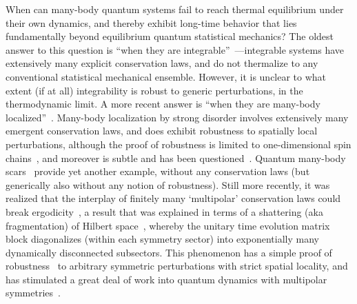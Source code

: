 When can many-body quantum systems fail to reach thermal equilibrium under their own dynamics, and thereby exhibit long-time behavior that lies fundamentally beyond equilibrium quantum statistical mechanics? The oldest answer to this question is ``when they are integrable''~\cite{Baxter2016Exactly}---integrable systems have extensively many explicit conservation laws, and do not thermalize to any conventional statistical mechanical ensemble. However, it is unclear to what extent (if at all) integrability is robust to generic perturbations, in the thermodynamic limit. A more recent answer is ``when they are many-body localized''~\cite{Nandkishore2015MBL, Abanin2019MBL}. Many-body localization by strong disorder involves extensively many emergent conservation laws, and does exhibit robustness to spatially local perturbations, although the proof of robustness is limited to one-dimensional spin chains~\cite{Imbrie2016MBL}, and moreover is subtle and has been questioned~\cite{Sels2021Obstruction}. Quantum many-body scars~\cite{Shiraishi2017ETH, Moudgalya2018AKLT, Turner2018Scarred, Chandran2023Scars} provide yet another example, without any conservation laws (but generically also without any notion of robustness). Still more recently, it was realized that the interplay of finitely many `multipolar' conservation laws could break ergodicity~\cite{Pai2019Localization}, a result that was explained in terms of a shattering (aka fragmentation) of Hilbert space~\cite{Khemani2020Localization, Sala2020Fragmentation, Moudgalya2022Thermalization}, whereby the unitary time evolution matrix block diagonalizes (within each symmetry sector) into exponentially many dynamically disconnected subsectors. This phenomenon has a simple proof of robustness~\cite{Khemani2020Localization} to arbitrary symmetric perturbations with strict spatial locality, and has stimulated a great deal of work into quantum dynamics with multipolar symmetries~\cite{Rakovszky2020SLIOM, Yang2020Confinement, Khudorozhkov2022Fragmentation, Moudgalya2022Commutant, Yoshinaga2022Ising, Hart2022Shattering, Bulmash2023Multipole, Gromov2020Fracton, Iaconis2019Subdiffusion, Glorioso2022Breakdown, RichterPal2022, Iaconis2021Multipole, Glorioso2021Nonabelian, Grosvenor2021Hydrodynamics, Osborne2021FractonFluids, Feldmeier2020Anomalous, Sala2022Modulated, Hart2022Quasiconservation, Qi2023FractonMHD, Guo2022Fracton, Glorioso2023Goldstone}. 

